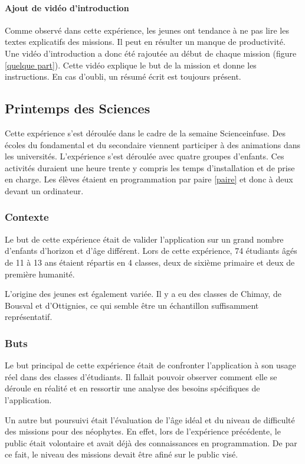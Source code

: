 \paragraph{Ajout de vidéo d'introduction}
Comme observé dans cette expérience, les jeunes ont tendance à ne pas lire les textes explicatifs des missions. Il peut en résulter un manque de productivité. Une vidéo d'introduction a donc été rajoutée au début de chaque mission (figure \ref{quelque part}). Cette vidéo explique le but de la mission et donne les instructions. En cas d'oubli, un résumé écrit est toujours présent.

\subsection{Printemps des Sciences}
Cette expérience s'est déroulée dans le cadre de la semaine Scienceinfuse. Des écoles du fondamental et du secondaire viennent participer à des animations dans les universités. L'expérience s'est déroulée avec quatre groupes d'enfants. Ces activités duraient une heure trente y compris les temps d'installation et de prise en charge. Les élèves étaient en programmation par paire \ref{paire} et donc à deux devant un ordinateur.

\subsubsection{Contexte}
Le but de cette expérience était de valider l'application sur un grand nombre d'enfants d'horizon et d'âge différent. Lors de cette expérience, 74 étudiants âgés de 11 à 13 ans étaient répartis en 4 classes, deux de sixième primaire et deux de première humanité.

L'origine des jeunes est également variée. Il y a eu des classes de Chimay, de Bousval et d'Ottignies, ce qui semble être un échantillon suffisamment représentatif.

\subsubsection{Buts}%
Le but principal de cette expérience était de confronter l'application à son usage réel dans des classes d'étudiants. Il fallait pouvoir observer comment elle se déroule en réalité et en ressortir une analyse des besoins spécifiques de l'application.

Un autre but poursuivi était l'évaluation de l'âge idéal et du niveau de difficulté des missions pour des néophytes. En effet, lors de l'expérience précédente, le public était volontaire et avait déjà des connaissances en programmation. De par ce fait, le niveau des missions devait être afiné sur le public visé.

